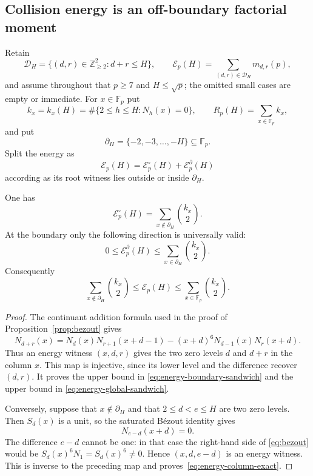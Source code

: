 
\subsection{Collision energy is an off-boundary factorial moment}

Retain
\[
 \mathscr D_H=\{(d,r)\in\mathbb Z_{\geq2}^2:d+r\leq H\},
 \qquad
 \mathcal E_p(H)=\sum_{(d,r)\in\mathscr D_H}m_{d,r}(p),
\]
and assume throughout that $p\geq7$ and $H\leq\sqrt p$; the omitted
small cases are empty or immediate.  For $x\in\mathbb F_p$ put
\[
 k_x=k_x(H)=\#\{2\leq h\leq H:N_h(x)=0\},
 \qquad R_p(H)=\sum_{x\in\mathbb F_p}k_x,
\]
and put
\[
 \partial_H=\{-2,-3,\ldots,-H\}\subseteq\mathbb F_p.
\]
Split the energy as
\[
 \mathcal E_p(H)=\mathcal E_p^\circ(H)+\mathcal E_p^\partial(H)
\]
according as its root witness lies outside or inside $\partial_H$.

\begin{proposition}
\label{prop:energy-column-exact}
One has
\begin{equation}\label{eq:energy-column-exact}
 \boxed{\mathcal E_p^\circ(H)
 =\sum_{x\notin\partial_H}\binom{k_x}{2}.}
\end{equation}
At the boundary only the following direction is universally valid:
\begin{equation}\label{eq:energy-boundary-sandwich}
 0\leq\mathcal E_p^\partial(H)
 \leq\sum_{x\in\partial_H}\binom{k_x}{2}.
\end{equation}
Consequently
\begin{equation}\label{eq:energy-global-sandwich}
 \sum_{x\notin\partial_H}\binom{k_x}{2}
 \leq\mathcal E_p(H)
 \leq\sum_{x\in\mathbb F_p}\binom{k_x}{2}.
\end{equation}
\end{proposition}

\begin{proof}
The continuant addition formula used in the proof of
Proposition~\ref{prop:bezout} gives
\[
 N_{d+r}(x)
 =N_d(x)N_{r+1}(x+d-1)
  -(x+d)^6N_{d-1}(x)N_r(x+d).
\]
Thus an energy witness $(x,d,r)$ gives the two zero levels $d$ and
$d+r$ in the column $x$.  This map is injective, since its lower level
and the difference recover $(d,r)$.  It proves the upper bound in
\eqref{eq:energy-boundary-sandwich} and the upper bound in
\eqref{eq:energy-global-sandwich}.

Conversely, suppose that $x\notin\partial_H$ and that $2\leq d<e\leq H$
are two zero levels.  Then $S_d(x)$ is a unit, so the saturated B\'ezout
identity gives
\[
 N_{e-d}(x+d)=0.
\]
The difference $e-d$ cannot be one: in that case the right-hand side of
\eqref{eq:bezout} would be $S_d(x)^6N_1=S_d(x)^6\ne0$.  Hence
$(x,d,e-d)$ is an energy witness.  This is inverse to the preceding map
and proves~\eqref{eq:energy-column-exact}.
\end{proof}

